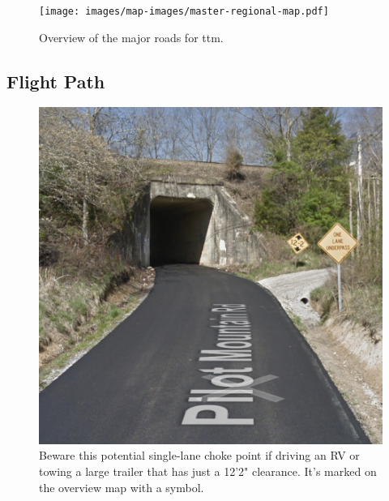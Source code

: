 \begin{figure}
\centering
\texttt{[image: images/map-images/master-regional-map.pdf]}
\caption{Overview of the major roads for \gls{ttm}.}
\label{image:overviewmap}
\end{figure}


\subsection*{Flight Path}

\begin{figure}[h!]
    \centering
    \includegraphics[width=\textwidth]{images/map-images/RouteChokePoint.png}
    \caption{Beware this potential single-lane choke point if driving an RV or towing a large trailer that has just a 12'2" clearance.  It's marked on the overview map with a \faWarning\xspace symbol.}
    \label{fig:map-choke-point}
\end{figure}

